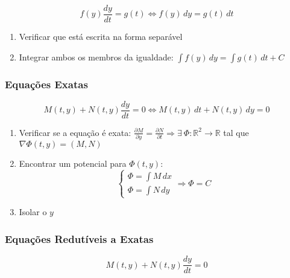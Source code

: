 \documentclass[11pt, a4paper]{article}
\begin{document}
\begin{equation*}
    f(y)\frac{dy}{dt} = g(t) \Leftrightarrow
    f(y) \, dy = g(t) \, dt
\end{equation*}

\begin{enumerate}
    \item Verificar que está escrita na forma separável
    \item Integrar ambos os membros da igualdade:
          $\displaystyle \int f(y) \, dy = \int g(t) \, dt + C$
\end{enumerate}

\subsubsection{Equações Exatas}

\begin{equation*}
    M(t,y) + N(t, y)\frac{dy}{dt} = 0 \Leftrightarrow
    M(t,y) \, dt + N(t, y) \, dy = 0
\end{equation*}

\begin{enumerate}
    \item Verificar se a equação é exata:
          $\displaystyle \frac{\partial M}{\partial y} =
              \frac{\partial N}{\partial t} \Rightarrow
              \exists\ \Phi: \mathbb{R}^2 \rightarrow \mathbb{R}$ tal que
          $\nabla \Phi(t, y) = (M, N)$
    \item Encontrar um potencial para $\Phi(t, y)$:
          \begin{equation*}
              \begin{cases}
                  \Phi = \int M \,dx \\
                  \Phi = \int N \,dy
              \end{cases} \Rightarrow
              \Phi = C
          \end{equation*}
    \item Isolar o $y$
\end{enumerate}

\subsubsection{Equações Redutíveis a Exatas}

\begin{equation*}
    M(t,y) + N(t, y)\frac{dy}{dt} = 0
\end{equation*}
\end{document}

